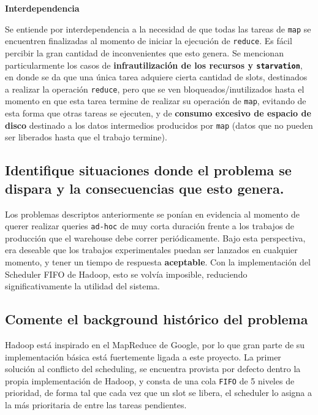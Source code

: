 \documentclass[11pt, a4paper, twoside]{article}
\begin{document}
\begin{center}
\textbf{Interdependencia}
\end{center}
Se entiende por interdependencia a la necesidad de que todas las tareas de
\texttt{map} se encuentren finalizadas al momento de iniciar la ejecución de
\texttt{reduce}. Es fácil percibir la gran cantidad de inconvenientes que esto
genera. Se mencionan particularmente los casos de \textbf{infrautilización de
los recursos y \texttt{starvation}}, en donde se da que una única tarea adquiere
cierta cantidad de slots, destinados a realizar la operación \texttt{reduce},
pero que se ven bloqueados/inutilizados hasta el momento en que esta tarea
termine de realizar su operación de \texttt{map}, evitando de esta forma que
otras tareas se ejecuten, y de \textbf{consumo excesivo de espacio de disco}
destinado a los datos intermedios producidos por \texttt{map} (datos que no
pueden ser liberados hasta que el trabajo termine).

\clearpage
\subsection {\footnotesize Identifique situaciones donde el problema se dispara y la consecuencias que esto genera.}
\label{investigacion-3}

Los problemas descriptos anteriormente se ponían en evidencia al momento de
querer realizar queries \texttt{ad-hoc} de muy corta duración frente a los
trabajos de producción que el warehouse debe correr periódicamente. Bajo esta
perspectiva, era deseable que los trabajos experimentales puedan ser lanzados
en cualquier momento, y tener un tiempo de respuesta \textbf{aceptable}. Con
la implementación del Scheduler FIFO de Hadoop, esto se volvía imposible,
reduciendo significativamente la utilidad del sistema.

\fixme


\clearpage


\subsection {\footnotesize Comente el background histórico del problema}
\label{investigacion-4}
Hadoop está inspirado en el MapReduce de Google, por lo que gran parte de su
implementación básica está fuertemente ligada a este proyecto. La primer
solución al conflicto del scheduling, se encuentra provista por defecto dentro
la propia implementación de Hadoop, y consta de una cola \texttt{FIFO} de 5
niveles de prioridad, de forma tal que cada vez que un slot se libera, el
scheduler lo asigna a la más prioritaria de entre las tareas pendientes.
\end{document}
